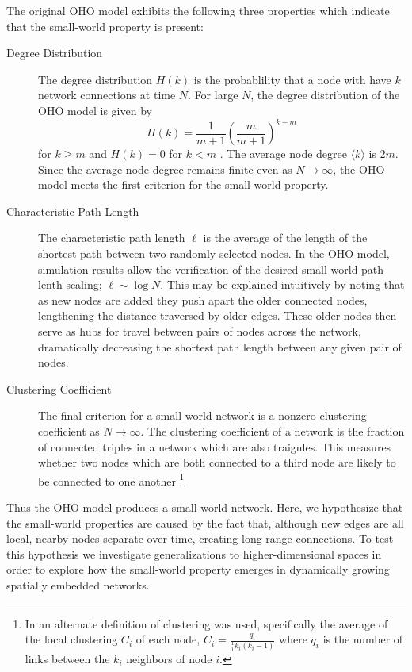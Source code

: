 \documentclass[aps,pre,reprint,superscriptaddress,amsmath,amssymb,nofootinbib]{revtex4-1}
\begin{document}
The original OHO model exhibits the following three properties which indicate that the small-world property is present:
\begin{description}
  \item[Degree Distribution] The degree distribution $H(k)$ is the probablility that a node with have $k$ network connections at time $N$.
For large $N$, the degree distribution of the OHO model is given by 
\begin{equation}
H(k) = \frac{1}{m+1}\left(\frac{m}{m+1}\right)^{k-m}
\end{equation}
for $k \geq m$ and $H(k) = 0$ for $k < m$ \cite{ozik2004}.
The average node degree $\langle k \rangle$ is $2m$.
Since the average node degree remains finite even as $N \to \infty$, the OHO model meets the first criterion for the small-world property.
  \item[Characteristic Path Length] The characteristic path length $\ell$ is the average of the length of the shortest path between two randomly selected nodes.
In the OHO model, simulation results allow the verification of the desired small world path lenth scaling; $\ell \sim \log N$.
This may be explained intuitively by noting that as new nodes are added they push apart the older connected nodes, lengthening the distance traversed by older edges. 
These older nodes then serve as hubs for travel between pairs of nodes across the network, dramatically decreasing the shortest path length between any given pair of nodes.
  \item[Clustering Coefficient] The final criterion for a small world network is a nonzero clustering coefficient as $N \to \infty$. 
The clustering coefficient of a network is the fraction of connected triples in a network which are also traignles.
This measures whether two nodes which are both connected to a third node are likely to be connected to one another \footnote{In \cite{ozik2004} an alternate definition of clustering was used, specifically the average of the local clustering $C_i$ of each node, $C_i = \frac{q_i}{\frac{1}{1} k_i (k_i-1)}$ where $q_i$ is the number of links between the $k_i$ neighbors of node $i$.}
\end{description}
Thus the OHO model produces a small-world network.
Here, we hypothesize that the small-world properties are caused by the fact that, although new edges are all local, nearby nodes separate over time, creating long-range connections.
To test this hypothesis we investigate generalizations to higher-dimensional spaces in order to explore how the small-world property emerges in dynamically growing spatially embedded networks.
\end{document}
